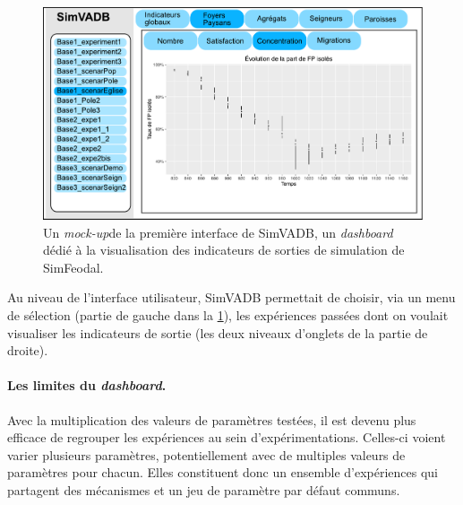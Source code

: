 \begin{figure}[H]
	\centering
	\includegraphics[width=\linewidth]{img/simvadb_mockup.pdf}
	\caption[Un \textit{mock-up} de la première interface de SimVADB, un \textit{dashboard} dédié à la visualisation des indicateurs de sorties de simulation de SimFeodal.]{Un \textit{mock-up}\footnotemark de la première interface de SimVADB, un \textit{dashboard} dédié à la visualisation des indicateurs de sorties de simulation de SimFeodal.}
	\label{fig:mockup_simvadb}
\end{figure}

Au niveau de l'interface utilisateur, SimVADB permettait de choisir, via un menu de sélection (partie de gauche dans la \cref{fig:mockup_simvadb}), les expériences passées dont on voulait visualiser les indicateurs de sortie (les deux niveaux d'onglets de la partie de droite).


\paragraph{Les limites du \textit{dashboard}.}
Avec la multiplication des valeurs de paramètres testées, il est devenu plus efficace de regrouper les expériences au sein d'expérimentations.
Celles-ci voient varier plusieurs paramètres, potentiellement avec de multiples valeurs de paramètres pour chacun.
Elles constituent donc un ensemble d'expériences qui partagent des mécanismes et un jeu de paramètre par défaut communs.

